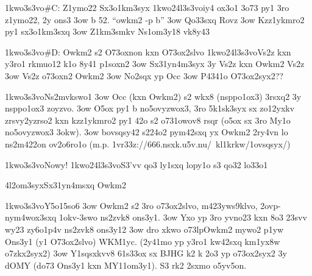   \p1kwo3s3vo{\#C: Z1ymo22 Sx3o1km3syx}
  \p1kwo24l3s3vo{iy4 ox3o1 3o73 py1 3ro z1ymo22, 2y ons3}
  \s3ow b 52. ``owkm2 -p b''
  \s3ow Qo33sxq Rovz
  \s3ow Kzz1ykmro2 py1 sx3o1km3sxq
  \s3ow Z1km3smkv Ns1om3y18 vk8y43

  \p1kwo3s3vo{\#D: Owkm2 s2 O73oxnon kxn O73ox2slvo}
  \p1kwo24l3s3vo{Vs2z kxn y3ro1 rkmuo12 k1o 8y41 p1soxn2}
  \s3ow Sx31yn4m3syx 3y Vs2z kxn Owkm2 Vs2z
  \s3ow Vs2z o73oxn2 Owkm2
  \s3ow No2sqx yp Occ
  \s3ow P4341o O73ox2syx2??


  \p1kwo3s3vo{Ns2mvkswo1}
  \s3ow Occ (kxn Owkm2) s2 wkx8 (nsppo1ox3) 3rsxq2 3y nsppo1ox3
    zoyzvo.
  \s3ow O5ox py1 b no5ovyzwox3, 3ro 5k1sk3syx sx zo12yxkv zrsvy2yzrso2
    kxn kzz1ykmro2 py1 42o s2 o731owov8 rsqr (o5ox sx 3ro My1o
    no5ovyzwox3 3okw).
  \s3ow bovsqsy42 s224o2 pym42sxq yx Owkm2 2ry4vn lo ns2m422on ov2o6ro1o 
    (m.p. \41v{r33z://666.nsxk.u5v.nu/~kl1krkw/1ovsqsyx/})

 \p1kwo3s3vo{Nowy!}
  \p1kwo24l3s3vo{S3'vv qo3 ly1sxq lopy1o s3 qo32 lo33o1}

\24l2om3syx{Sx31yn4msxq Owkm2}

 \p1kwo3s3vo{Y5o15so6}
  \s3ow Owkm2 s2 3ro o73ox2slvo, m423yws9klvo, 2ovp-nym4wox3sxq
    1okv-3swo ns2zvk8 ons3y1.
  \s3ow Yxo yp 3ro yvno23 kxn 8o3 23svv wy23 zy6o1p4v ns2zvk8 ons3y12
  \s3ow dro xkwo \3o73lp{Owkm2} mywo2 p1yw Ons3y1 (y1 O73ox2slvo)
    WKM1yc. (2y41mo yp y3ro1 kw42sxq km1yx8w o7zkx2syx2)
  \s3ow Y1sqsxkvv8 61s33ox sx BJHG k2 k 2o3 yp o73ox2syx2 3y dOMY
    (do73 Ons3y1 kxn MY11om3y1).  S3 rk2 2sxmo o5yv5on.

